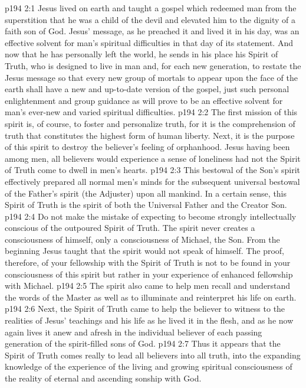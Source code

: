 \vs p194 2:1 Jesus lived on earth and taught a gospel which redeemed man from the superstition that he was a child of the devil and elevated him to the dignity of a faith son of God. Jesus’ message, as he preached it and lived it in his day, was an effective solvent for man’s spiritual difficulties in that day of its statement. And now that he has personally left the world, he sends in his place his Spirit of Truth, who is designed to live in man and, for each new generation, to restate the Jesus message so that every new group of mortals to appear upon the face of the earth shall have a new and up\hyp{}to\hyp{}date version of the gospel, just such personal enlightenment and group guidance as will prove to be an effective solvent for man’s ever\hyp{}new and varied spiritual difficulties.
\vs p194 2:2 \pc The first mission of this spirit is, of course, to foster and personalize truth, for it is the comprehension of truth that constitutes the highest form of human liberty. Next, it is the purpose of this spirit to destroy the believer’s feeling of orphanhood. Jesus having been among men, all believers would experience a sense of loneliness had not the Spirit of Truth come to dwell in men’s hearts.
\vs p194 2:3 This bestowal of the Son’s spirit effectively prepared all normal men’s minds for the subsequent universal bestowal of the Father’s spirit (the Adjuster) upon all mankind. In a certain sense, this Spirit of Truth is the spirit of both the Universal Father and the Creator Son.
\vs p194 2:4 Do not make the mistake of expecting to become strongly intellectually conscious of the outpoured Spirit of Truth. The spirit never creates a consciousness of himself, only a consciousness of Michael, the Son. From the beginning Jesus taught that the spirit would not speak of himself. The proof, therefore, of your fellowship with the Spirit of Truth is not to be found in your consciousness of this spirit but rather in your experience of enhanced fellowship with Michael.
\vs p194 2:5 The spirit also came to help men recall and understand the words of the Master as well as to illuminate and reinterpret his life on earth.
\vs p194 2:6 Next, the Spirit of Truth came to help the believer to witness to the realities of Jesus’ teachings and his life as he lived it in the flesh, and as he now again lives it anew and afresh in the individual believer of each passing generation of the spirit\hyp{}filled sons of God.
\vs p194 2:7 Thus it appears that the Spirit of Truth comes really to lead all believers into all truth, into the expanding knowledge of the experience of the living and growing spiritual consciousness of the reality of eternal and ascending sonship with God.
